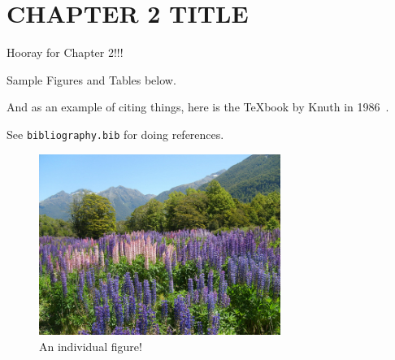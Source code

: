 \chapter{CHAPTER 2 TITLE}
\label{chap:chapter_2}

Hooray for Chapter 2!!!

Sample Figures and Tables below.

And as an example of citing things, here is the \TeX book by Knuth in 1986~\cite{knuth1986texbook}. 

See \verb|bibliography.bib| for doing references.

\begin{figure}[h]
	\centering
	\includegraphics[width=0.7\textwidth]{./Plots/nature.jpg}
	\caption{An individual figure!}
\end{figure}
        
